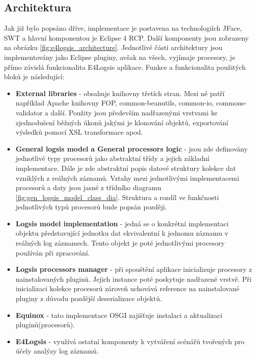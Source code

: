 \documentclass[ing,male,java,dept460]{diploma}		%
\begin{document}
\subsection{Architektura}
Jak již bylo popsáno dříve, implementace je postavena na technologiích JFace, SWT a hlavní komponentou je Eclipse 4 RCP. Další komponenty jsou zobrazeny na obrázku \ref{fig:e4logsis_architecture}. 
Jednotlivé části architektury jsou implementovány jako Eclipse pluginy, avšak na všech, vyjímaje procesory, je přímo závislá funkcionalita E4Logsis aplikace. Funkce a funkcionalita použitých bloků je následující:
\begin{itemize}
\item \textbf{External libraries} - obsahuje knihovny třetích stran. Mezi ně patří například Apache knihovny FOP, common-beanutils, common-io, commons-validator a další. Použity jsou především nadřazenými vrstvami ke zjednodušení běžných úkonů jakými je klonování objektů, exportování výsledků pomocí XSL transformace apod.
\item \textbf{General logsis model a General processors logic} - jsou zde definovány jednotlivé typy procesorů jako abstraktní třídy a jejich základní implementace. Dále je zde abstraktní popis datové struktury kolekce dat vzniklých z reálných záznamů. Vztahy mezi jednotlivými implementacemi procesorů a daty jsou jasné z třídního diagramu \ref{fig:gen_logsis_model_class_dia}. Struktura a rozdíl ve funkčnosti jednotlivých typů procesorů bude popsán později.
\item \textbf{Logsis model implementation} - jedná se o konkrétní implementaci objektu představující jednotku dat ekvivalentní k jednomu záznamu v reálných log záznamech. Tento objekt je poté jednotlivými procesory používán při zpracování.
\item \textbf{Logsis processors manager} - při spouštění aplikace inicializuje procesory z nainstalovaných pluginů. Jejich instance poté poskytuje nadřazené vrstvě. Při inicializaci kolekce procesorů zároveň uchovává reference na nainstalované pluginy z důvodu pozdější deserializace objektů.
\item \textbf{Equinox} - tato implementace OSGI zajišťuje instalaci a aktualizaci pluginů(procesorů).
\item \textbf{E4Logsis} - využívá ostatní komponenty k vytváření scénářů tvořených pro účely analýzy log záznamů.
\end{itemize}
\end{document}

